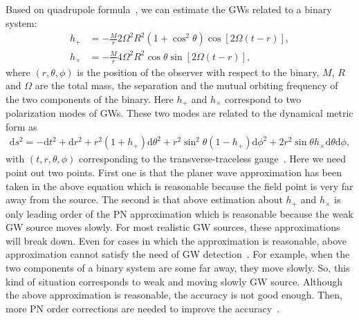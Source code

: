 \documentclass[a4paper,11pt]{article}
\begin{document}
Based on quadrupole formula~\cite{baumgarte2010numerical}, we can estimate the GWs related to a binary system:
\begin{align}
h_+&=-\frac{M}{r}2\Omega^2R^2(1+\cos^2\theta)\cos[2\Omega(t-r)],\\
h_\times&=-\frac{M}{r}4\Omega^2R^2\cos\theta\sin[2\Omega(t-r)],
\end{align}
where $(r,\theta,\phi)$ is the position of the observer with respect to the binary, $M$, $R$ and $\Omega$ are the total mass, the separation and the mutual orbiting frequency of the two components of the binary. Here $h_+$ and $h_\times$ correspond to  two polarization modes of GWs. These two modes are related to the dynamical metric form as
\begin{align}
\mathrm{d}s^2=-\mathrm{d}t^2+\mathrm{d}r^2+r^2(1+h_+)\mathrm{d}\theta^2+r^2\sin^2\theta(1-h_+)\mathrm{d}\phi^2+2r^2\sin\theta h_\times \mathrm{d}\theta \mathrm{d}\phi,
\end{align}
with $(t,r,\theta,\phi)$ corresponding to the transverse-traceless gauge~\cite{liang00}. Here we need point out two points. First one is that the planer wave approximation has been taken in the above equation which is reasonable because the field point is very far away from the source. The second is that above estimation about $h_+$ and $h_\times$ is only leading order of the PN approximation which is reasonable because the weak GW source moves slowly. For most realistic GW sources, these approximations will break down. Even for cases in which the approximation is reasonable, above approximation cannot satisfy the need of GW detection~\cite{Lindblom:2008cm,Lindblom:2016csg}. For example, when the two components of a binary system are some far away, they move slowly. So, this kind of situation corresponds to weak and moving slowly GW source. Although the above approximation is reasonable, the accuracy is not good enough. Then, more PN order corrections are needed to improve the accuracy~\cite{Blanchet:2013haa}.
\end{document}
